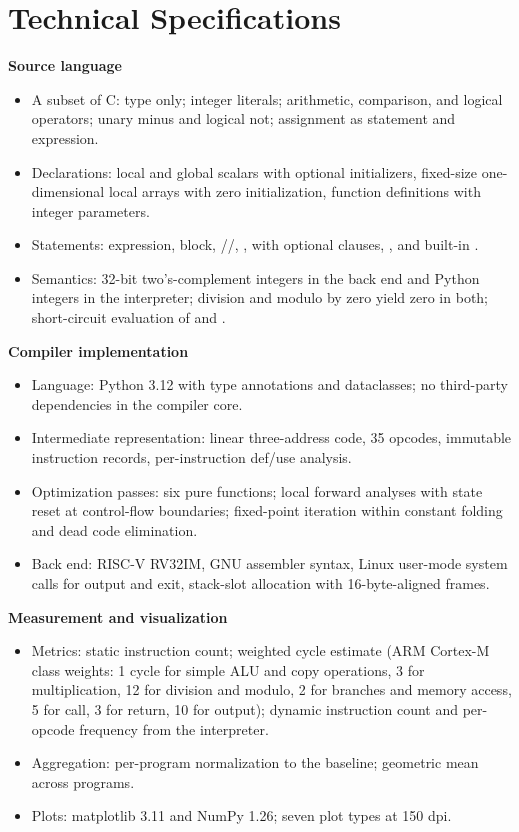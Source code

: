 \section{Technical Specifications}

\textbf{Source language}
\begin{itemize}
  \item A subset of C:  type only; integer literals; arithmetic, comparison, and logical operators; unary minus and logical not; assignment as statement and expression.
  \item Declarations: local and global scalars with optional initializers, fixed-size one-dimensional local arrays with zero initialization, function definitions with integer parameters.
  \item Statements: expression, block, //, ,  with optional clauses, , and built-in .
  \item Semantics: 32-bit two's-complement integers in the back end and Python integers in the interpreter; division and modulo by zero yield zero in both; short-circuit evaluation of \code{\&\&} and \code{||}.
\end{itemize}

\textbf{Compiler implementation}
\begin{itemize}
  \item Language: Python 3.12 with type annotations and dataclasses; no third-party dependencies in the compiler core.
  \item Intermediate representation: linear three-address code, 35 opcodes, immutable instruction records, per-instruction def/use analysis.
  \item Optimization passes: six pure functions; local forward analyses with state reset at control-flow boundaries; fixed-point iteration within constant folding and dead code elimination.
  \item Back end: RISC-V RV32IM, GNU assembler syntax, Linux user-mode system calls for output and exit, stack-slot allocation with 16-byte-aligned frames.
\end{itemize}

\textbf{Measurement and visualization}
\begin{itemize}
  \item Metrics: static instruction count; weighted cycle estimate (ARM Cortex-M class weights: 1 cycle for simple ALU and copy operations, 3 for multiplication, 12 for division and modulo, 2 for branches and memory access, 5 for call, 3 for return, 10 for output); dynamic instruction count and per-opcode frequency from the interpreter.
  \item Aggregation: per-program normalization to the baseline; geometric mean across programs.
  \item Plots: matplotlib 3.11 and NumPy 1.26; seven plot types at 150 dpi.
\end{itemize}

